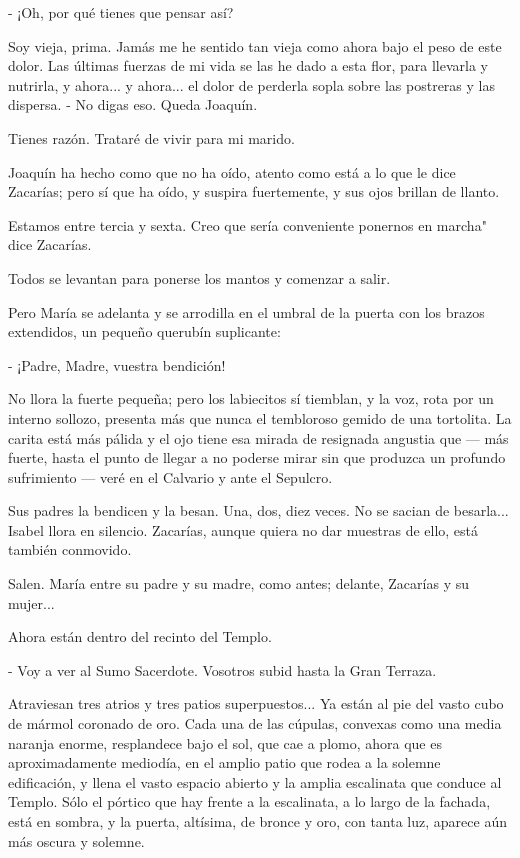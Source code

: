 \documentclass[12pt]{book} %
\begin{document}
- ¡Oh, por qué tienes que pensar así? 

Soy vieja, prima. Jamás me he sentido tan vieja como ahora bajo el peso de este dolor. Las últimas fuerzas de mi vida se las he dado a esta flor, para llevarla y nutrirla, y ahora... y ahora... el dolor de perderla sopla sobre las postreras y las dispersa. - No digas eso. Queda Joaquín. 

Tienes razón. Trataré de vivir para mi marido. 

Joaquín ha hecho como que no ha oído, atento como está a lo que le dice Zacarías; pero sí que ha oído, y suspira fuertemente, y sus ojos brillan de llanto. 

Estamos entre tercia y sexta. Creo que sería conveniente ponernos en marcha" dice Zacarías. 

Todos se levantan para ponerse los mantos y comenzar a salir. 

Pero María se adelanta y se arrodilla en el umbral de la puerta con los brazos extendidos, un pequeño querubín suplicante: 

- ¡Padre, Madre, vuestra bendición! 

No llora la fuerte pequeña; pero los labiecitos sí tiemblan, y la voz, rota por un interno sollozo, presenta más que nunca el tembloroso gemido de una tortolita. La carita está más pálida y el ojo tiene esa mirada de resignada angustia que — más fuerte, hasta el punto de llegar a no poderse mirar sin que produzca un profundo sufrimiento — veré en el Calvario y ante el Sepulcro. 

Sus padres la bendicen y la besan. Una, dos, diez veces. No se sacian de besarla... Isabel llora en silencio. Zacarías, aunque quiera no dar muestras de ello, está también conmovido. 

Salen. María entre su padre y su madre, como antes; delante, Zacarías y su mujer... 

Ahora están dentro del recinto del Templo. 

- Voy a ver al Sumo Sacerdote. Vosotros subid hasta la Gran Terraza. 

Atraviesan tres atrios y tres patios superpuestos... Ya están al pie del vasto cubo de mármol coronado de oro. Cada una de las cúpulas, convexas como una media naranja enorme, resplandece bajo el sol, que cae a plomo, ahora que es aproximadamente mediodía, en el amplio patio que rodea a la solemne edificación, y llena el vasto espacio abierto y la amplia escalinata que conduce al Templo. Sólo el pórtico que hay frente a la escalinata, a lo largo de la fachada, está en sombra, y la puerta, altísima, de bronce y oro, con tanta luz, aparece aún más oscura y solemne. 
\end{document}
